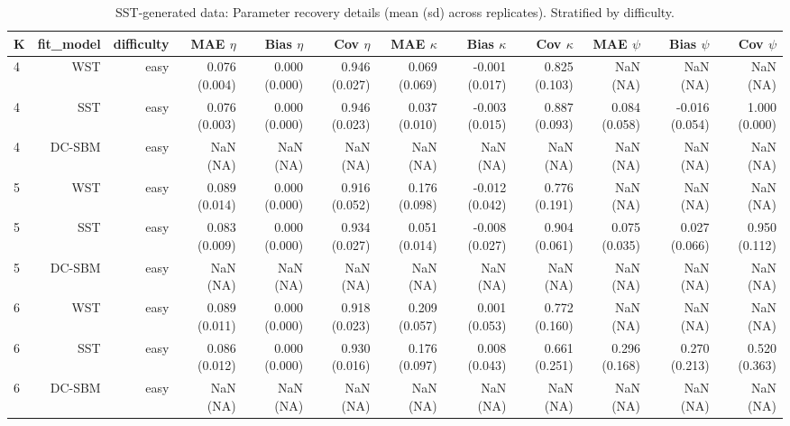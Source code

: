\begin{table}[!h]
\centering
\caption{SST-generated data: Parameter recovery details (mean (sd) across replicates). Stratified by difficulty.\\\label{tab:sst-appx-params}}
\centering
\begin{tabular}[t]{lrrrrrrrrrrr}
\toprule
K & fit_model & difficulty & MAE $\eta$ & Bias $\eta$ & Cov $\eta$ & MAE $\kappa$ & Bias $\kappa$ & Cov $\kappa$ & MAE $\psi$ & Bias $\psi$ & Cov $\psi$\\
\midrule
4 & WST & easy & 0.076 (0.004) & 0.000 (0.000) & 0.946 (0.027) & 0.069 (0.069) & -0.001 (0.017) & 0.825 (0.103) & NaN (NA) & NaN (NA) & NaN (NA)\\
4 & SST & easy & 0.076 (0.003) & 0.000 (0.000) & 0.946 (0.023) & 0.037 (0.010) & -0.003 (0.015) & 0.887 (0.093) & 0.084 (0.058) & -0.016 (0.054) & 1.000 (0.000)\\
4 & DC-SBM & easy & NaN (NA) & NaN (NA) & NaN (NA) & NaN (NA) & NaN (NA) & NaN (NA) & NaN (NA) & NaN (NA) & NaN (NA)\\
5 & WST & easy & 0.089 (0.014) & 0.000 (0.000) & 0.916 (0.052) & 0.176 (0.098) & -0.012 (0.042) & 0.776 (0.191) & NaN (NA) & NaN (NA) & NaN (NA)\\
5 & SST & easy & 0.083 (0.009) & 0.000 (0.000) & 0.934 (0.027) & 0.051 (0.014) & -0.008 (0.027) & 0.904 (0.061) & 0.075 (0.035) & 0.027 (0.066) & 0.950 (0.112)\\
5 & DC-SBM & easy & NaN (NA) & NaN (NA) & NaN (NA) & NaN (NA) & NaN (NA) & NaN (NA) & NaN (NA) & NaN (NA) & NaN (NA)\\
6 & WST & easy & 0.089 (0.011) & 0.000 (0.000) & 0.918 (0.023) & 0.209 (0.057) & 0.001 (0.053) & 0.772 (0.160) & NaN (NA) & NaN (NA) & NaN (NA)\\
6 & SST & easy & 0.086 (0.012) & 0.000 (0.000) & 0.930 (0.016) & 0.176 (0.097) & 0.008 (0.043) & 0.661 (0.251) & 0.296 (0.168) & 0.270 (0.213) & 0.520 (0.363)\\
6 & DC-SBM & easy & NaN (NA) & NaN (NA) & NaN (NA) & NaN (NA) & NaN (NA) & NaN (NA) & NaN (NA) & NaN (NA) & NaN (NA)\\
\bottomrule
\end{tabular}
\end{table}
